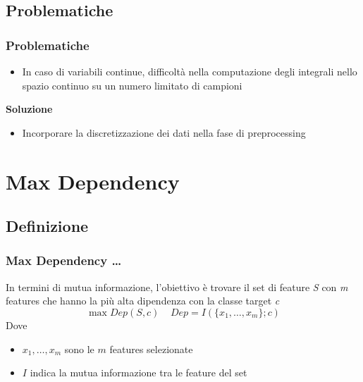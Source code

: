 \documentclass{beamer}
\begin{document}
\subsection{Problematiche}
\begin{frame}
	\frametitle{Problematiche}
	\begin{itemize}
		\item In caso di variabili continue, difficoltà nella computazione degli integrali nello spazio continuo su un numero limitato di campioni
	\end{itemize}
	\textbf{Soluzione}
	\begin{itemize}
		\item Incorporare la discretizzazione dei dati nella fase di preprocessing
	\end{itemize}
\end{frame}


\section{Max Dependency}
\subsection{Definizione}
\begin{frame}
	\frametitle{Max Dependency \dots}
	In termini di mutua informazione, l'obiettivo è trovare il set di feature \emph{S} con \emph{m} features che hanno la più alta dipendenza con la classe target \emph{c}
	$$ \max Dep(S,c)~~~~~ Dep = I(\{x_1,\dots,x_m \};c )$$
	Dove 
	\begin{itemize}
		\item $x_1,\dots,x_m$ sono le $m$ features selezionate
		\item $I$ indica la mutua informazione tra le feature del set
	\end{itemize}
\end{frame}
\end{document}

